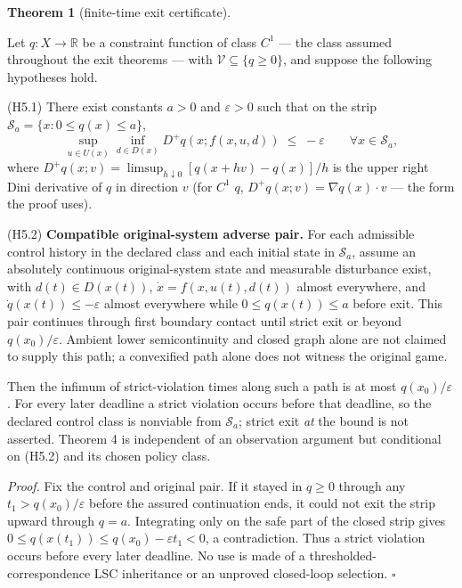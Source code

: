 \documentclass[11pt]{article}
\theoremstyle{definition}
\newtheorem{theorem}{Theorem}
\begin{document}
\begin{theorem}[finite-time exit certificate]\label{thm:exit}

Let \(q : X \to \mathbb{R}\) be a constraint function of class \(C^1\) --- the class assumed throughout the exit theorems --- with
\(\mathcal{V} \subseteq \{ q \ge 0 \}\), and suppose the following
hypotheses hold.

(H5.1) There exist constants \(a > 0\) and \(\varepsilon > 0\) such that
on the strip \(\mathcal{S}_a = \{ x : 0 \le q(x) \le a \}\),
\[\sup_{u \in U(x)} \inf_{d \in D(x)} D^+ q(x; f(x,u,d)) \;\le\; -\varepsilon \qquad \forall x \in \mathcal{S}_a, \tag{4}\]
where \(D^+ q(x; v) = \limsup_{h \downarrow 0} [q(x + hv) - q(x)]/h\) is
the upper right Dini derivative of \(q\) in direction \(v\) (for \(C^1\)
\(q\), \(D^+ q(x; v) = \nabla q(x) \cdot v\) --- the form the proof
uses).

(H5.2) \textbf{Compatible original-system adverse pair.} For each admissible control history in the declared class and each initial state in \(\mathcal S_a\), assume an absolutely continuous original-system state and measurable disturbance exist, with \(d(t)\in D(x(t))\), \(\dot x=f(x,u(t),d(t))\) almost everywhere, and \(\dot q(x(t))\le-\varepsilon\) almost everywhere while \(0\le q(x(t))\le a\) before exit. This pair continues through first boundary contact until strict exit or beyond \(q(x_0)/\varepsilon\). Ambient lower semicontinuity and closed graph alone are not claimed to supply this path; a convexified path alone does not witness the original game.

Then the infimum of strict-violation times along such a path is at most \(q(x_0)/\varepsilon\). For every later deadline a strict violation occurs before that deadline, so the declared control class is nonviable from \(\mathcal S_a\); strict exit \emph{at} the bound is not asserted. Theorem 4 is independent of an observation argument but conditional on (H5.2) and its chosen policy class.
\end{theorem}

\emph{Proof.} Fix the control and original pair. If it stayed in \(q\ge0\) through any \(t_1>q(x_0)/\varepsilon\) before the assured continuation ends, it could not exit the strip upward through \(q=a\). Integrating only on the safe part of the closed strip gives \(0\le q(x(t_1))\le q(x_0)-\varepsilon t_1<0\), a contradiction. Thus a strict violation occurs before every later deadline. No use is made of a thresholded-correspondence LSC inheritance or an unproved closed-loop selection. \ensuremath{\square}
\end{document}
